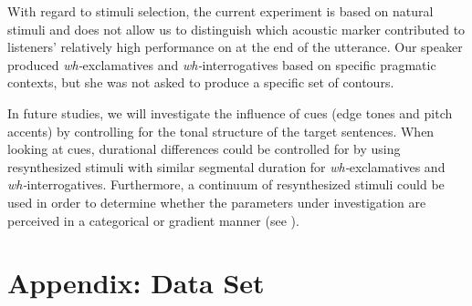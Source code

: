 \documentclass[output=paper]{langsci/langscibook}
\begin{document}
With regard to stimuli selection, the current experiment is based on natural stimuli and does not allow us to distinguish which acoustic marker contributed to listeners’ relatively high performance on  at the end of the utterance. Our speaker produced \textit{wh-}ex\-cla\-ma\-tives and \textit{wh-}in\-ter\-ro\-ga\-tives based on specific pragmatic contexts, but she was not asked to produce a specific set of  contours. 

In future studies, we will investigate the influence of  cues (edge tones and pitch accents) by controlling for the tonal structure of the target sentences. When looking at  cues, durational differences could be controlled for by using resynthesized stimuli with similar segmental duration for \textit{wh-}exclamatives and \textit{wh-}interrogatives. Furthermore, a continuum of resynthesized stimuli could be used in order to determine whether the  parameters under investigation are perceived in a categorical or gradient manner (see \citealt{Niebuhr2007}). 

\pagebreak

\section*{Appendix: Data Set}



\end{document}
